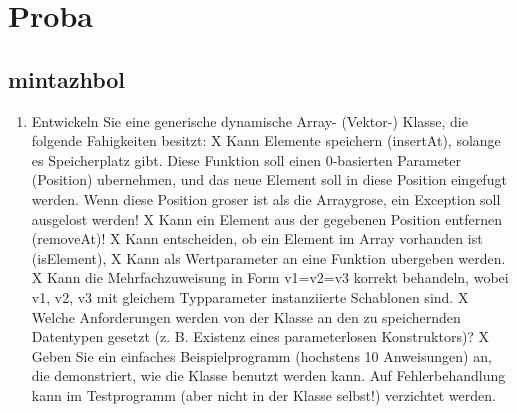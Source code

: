 \section{Proba}
\subsection{mintazhbol}

\renewcommand{\labelenumi}{\thesubsection.\theenumi.}
\begin{enumerate}

\item Entwickeln Sie eine generische dynamische Array- (Vektor-) Klasse, die folgende Fahigkeiten besitzt:
X Kann Elemente speichern (insertAt), solange es Speicherplatz gibt. Diese Funktion soll einen 0-basierten Parameter (Position) ubernehmen, und das neue Element soll in diese Position eingefugt werden. Wenn diese Position groser ist als die Arraygrose, ein Exception soll ausgelost werden!
X Kann ein Element aus der gegebenen Position entfernen (removeAt)!
X Kann entscheiden, ob ein Element im Array vorhanden ist (isElement),
X Kann als Wertparameter an eine Funktion ubergeben werden.
X Kann die Mehrfachzuweisung in Form v1=v2=v3 korrekt behandeln, wobei v1, v2, v3 mit gleichem Typparameter instanziierte Schablonen sind.
X Welche Anforderungen werden von der Klasse an den zu speichernden Datentypen gesetzt (z. B. Existenz eines parameterlosen Konstruktors)?
X Geben Sie ein einfaches Beispielprogramm (hochstens 10 Anweisungen) an, die demonstriert, wie die Klasse benutzt werden kann. Auf Fehlerbehandlung kann im Testprogramm (aber nicht in der Klasse selbst!) verzichtet werden.

\end{enumerate} 